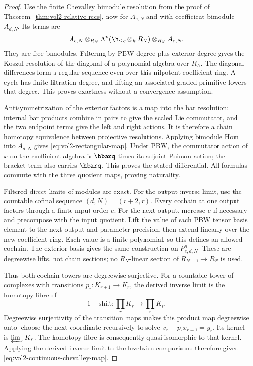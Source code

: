 \begin{proof}
Use the finite Chevalley bimodule resolution from the proof of
Theorem~\ref{thm:vol2-relative-rees}, now for $A_{e,N}$ and with
coefficient bimodule $A_{d,N}$. Its terms are
\[
 A_{e,N}\otimes_{R_N}\Lambda^n(\h_{\leq e}\otimes_kR_N)
          \otimes_{R_N}A_{e,N}.
\]
They are free bimodules. Filtering by PBW degree plus exterior
degree gives the Koszul resolution of the diagonal of a polynomial
algebra over $R_N$. The diagonal differences form a regular sequence
even over this nilpotent coefficient ring. A cycle has finite
filtration degree, and lifting an associated-graded primitive lowers
that degree. This proves exactness without a convergence assumption.

Antisymmetrization of the exterior factors is a map into the bar
resolution: internal bar products combine in pairs to give the
scaled Lie commutator, and the two endpoint terms give the left and
right actions. It is therefore a chain homotopy equivalence between
projective resolutions. Applying bimodule Hom into $A_{d,N}$ gives
\eqref{eq:vol2-rectangular-map}. Under PBW, the commutator action of
$x$ on the coefficient algebra is $\hbarq$ times its adjoint Poisson
action; the bracket term also carries $\hbarq$. This proves the
stated differential. All formulas commute with the three quotient
maps, proving naturality.

Filtered direct limits of modules are exact. For the output inverse
limit, use the countable cofinal sequence $(d,N)=(r+2,r)$.
Every cochain at one output factors through a finite input order
$e$. For the next output, increase $e$ if necessary and precompose
with the input quotient. Lift the value of each PBW tensor basis
element to the next output and parameter precision, then extend
linearly over the new coefficient ring. Each value is a finite
polynomial, so this defines an allowed cochain. The exterior basis
gives the same construction on $P^n_{e,d,N}$. These are degreewise
lifts, not chain sections; no $R_N$-linear section of
$R_{N+1}\to R_N$ is used.

Thus both cochain towers are degreewise surjective. For a countable
tower of complexes with transitions $p_r:K_{r+1}\to K_r$, the
derived inverse limit is the homotopy fibre of
\[
 1-\mathrm{shift}:\prod_rK_r\longrightarrow\prod_rK_r.
\]
Degreewise surjectivity of the transition maps makes this product
map degreewise onto: choose the next coordinate recursively to
solve $x_r-p_rx_{r+1}=y_r$. Its kernel is $\varprojlim_rK_r$.
The homotopy fibre is consequently quasi-isomorphic to that kernel.
Applying the derived inverse limit to the levelwise comparisons
therefore gives \eqref{eq:vol2-continuous-chevalley-map}.
\end{proof}

